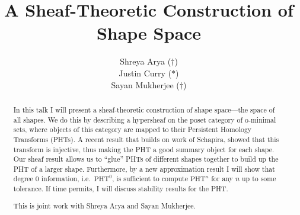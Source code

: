 \documentclass{UAmathtalk-spec}
\author{Shreya Arya ($\dagger$) \\ Justin Curry ($*$) \\  Sayan Mukherjee ($\dagger$)}
\title{A Sheaf-Theoretic Construction of Shape Space}
\begin{document}
\maketitle

\begin{abstract}
In this talk I will present a sheaf-theoretic construction of shape space---the space of all shapes. We do this by describing a hypersheaf on the poset category of o-minimal sets, where objects of this category are mapped to their Persistent Homology Transforms (PHTs). A recent result that builds on work of Schapira, showed that this transform is injective, thus making the PHT a good summary object for each shape. Our sheaf result allows us to ``glue'' PHTs of different shapes together to build up the PHT of a larger shape. Furthermore, by a new approximation result I will show that degree 0 information, i.e.~$\text{PHT}^0$, is sufficient to compute $\text{PHT}^n$ for any $n$ up to some tolerance. If time permits, I will discuss stability results for the PHT.

This is joint work with Shreya Arya and Sayan Mukherjee.
\end{abstract}
\end{document}
